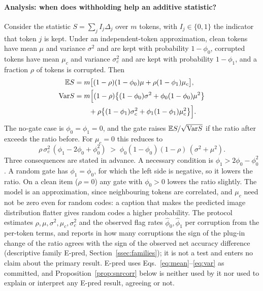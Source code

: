 \paragraph{Analysis: when does withholding help an additive statistic?}\label{par:snr}
Consider the statistic $S=\sum_j I_j\Delta_j$ over $m$ tokens, with $I_j\in\{0,1\}$ the indicator that token $j$ is kept.
Under an independent-token approximation, clean tokens have mean $\mu$ and variance $\sigma^2$ and are kept with probability
$1-\phi_0$, corrupted tokens have mean $\mu_c$ and variance $\sigma_c^2$ and are kept with probability $1-\phi_1$, and a fraction
$\rho$ of tokens is corrupted.
Then
\begin{align}
\mathbb{E} S&=m\big[(1-\rho)(1-\phi_0)\mu+\rho(1-\phi_1)\mu_c\big],\label{eq:mean}\\
\mathrm{Var} S&=m\Big[(1-\rho)\big\{(1-\phi_0)\sigma^2+\phi_0(1-\phi_0)\mu^2\big\}\notag\\
&\qquad+\rho\big\{(1-\phi_1)\sigma_c^2+\phi_1(1-\phi_1)\mu_c^2\big\}\Big].\label{eq:var}
\end{align}
The no-gate case is $\phi_0=\phi_1=0$, and the gate raises $\mathbb{E} S/\sqrt{\mathrm{Var} S}$ if the ratio after exceeds the ratio before.
For $\mu_c=0$ this reduces to
\begin{equation}
\rho\,\sigma_c^2\,(\phi_1-2\phi_0+\phi_0^2)\;>\;\phi_0(1-\phi_0)(1-\rho)\,(\sigma^2+\mu^2).
\label{eq:snr}
\end{equation}
Three consequences are stated in advance.
A necessary condition is $\phi_1>2\phi_0-\phi_0^2$.
A random gate has $\phi_1=\phi_0$, for which the left side is negative, so it lowers the ratio.
On a clean item ($\rho=0$) any gate with $\phi_0>0$ lowers the ratio slightly.
The model is an approximation, since neighbouring tokens are correlated, and $\mu_c$ need not be zero even for random codes: a
caption that makes the predicted image distribution flatter gives random codes a higher probability.
The protocol estimates $\rho,\mu,\sigma^2,\mu_c,\sigma_c^2$ and the observed flag rates $\hat\phi_0,\hat\phi_1$ per corruption from
the per-token terms, and reports in how many corruptions the sign of the plug-in change of the ratio agrees with the sign of the
observed net accuracy difference (descriptive family E-pred, Section~\ref{ssec:families}); it is not a test and enters no claim
about the primary result.
E-pred uses Eqs.~\eqref{eq:mean}--\eqref{eq:var} as committed, and Proposition~\ref{prop:snrcorr} below is neither used by it nor
used to explain or interpret any E-pred result, agreeing or not.

